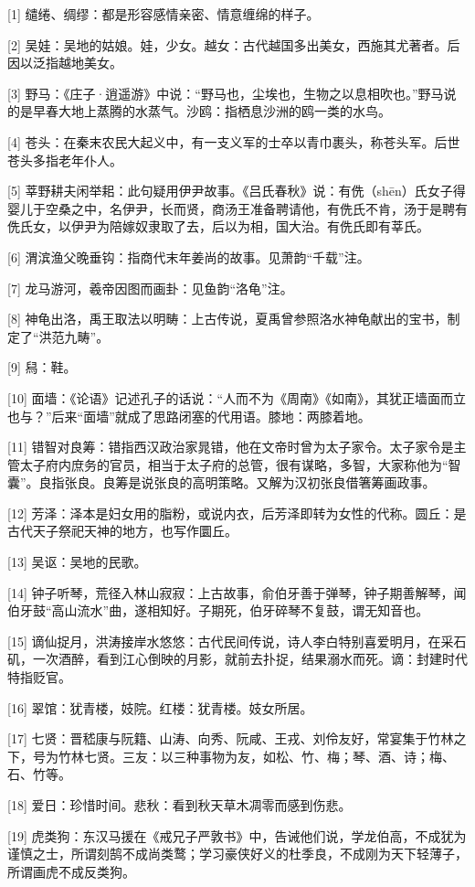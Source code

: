 \documentclass[12pt,UTF8]{ctexbook}
\begin{document}
[1] 缱绻、绸缪：都是形容感情亲密、情意缠绵的样子。

[2] 吴娃：吴地的姑娘。娃，少女。越女：古代越国多出美女，西施其尤著者。后因以泛指越地美女。

[3] 野马：《庄子·逍遥游》中说：“野马也，尘埃也，生物之以息相吹也。”野马说的是早春大地上蒸腾的水蒸气。沙鸥：指栖息沙洲的鸥一类的水鸟。

[4] 苍头：在秦末农民大起义中，有一支义军的士卒以青巾裹头，称苍头军。后世苍头多指老年仆人。

[5] 莘野耕夫闲举耜：此句疑用伊尹故事。《吕氏春秋》说：有侁（shēn）氏女子得婴儿于空桑之中，名伊尹，长而贤，商汤王准备聘请他，有侁氏不肯，汤于是聘有侁氏女，以伊尹为陪嫁奴隶取了去，后以为相，国大治。有侁氏即有莘氏。

[6] 渭滨渔父晚垂钩：指商代末年姜尚的故事。见萧韵“千载”注。

[7] 龙马游河，羲帝因图而画卦：见鱼韵“洛龟”注。

[8] 神龟出洛，禹王取法以明畴：上古传说，夏禹曾参照洛水神龟献出的宝书，制定了“洪范九畴”。

[9] 舄：鞋。

[10] 面墙：《论语》记述孔子的话说：“人而不为《周南》《如南》，其犹正墙面而立也与？”后来“面墙”就成了思路闭塞的代用语。膝地：两膝着地。

[11] 错智对良筹：错指西汉政治家晁错，他在文帝时曾为太子家令。太子家令是主管太子府内庶务的官员，相当于太子府的总管，很有谋略，多智，大家称他为“智囊”。良指张良。良筹是说张良的高明策略。又解为汉初张良借箸筹画政事。

[12] 芳泽：泽本是妇女用的脂粉，或说内衣，后芳泽即转为女性的代称。圆丘：是古代天子祭祀天神的地方，也写作圜丘。

[13] 吴讴：吴地的民歌。

[14] 钟子听琴，荒径入林山寂寂：上古故事，俞伯牙善于弹琴，钟子期善解琴，闻伯牙鼓“高山流水”曲，遂相知好。子期死，伯牙碎琴不复鼓，谓无知音也。

[15] 谪仙捉月，洪涛接岸水悠悠：古代民间传说，诗人李白特别喜爱明月，在采石矶，一次酒醉，看到江心倒映的月影，就前去扑捉，结果溺水而死。谪：封建时代特指贬官。

[16] 翠馆：犹青楼，妓院。红楼：犹青楼。妓女所居。

[17] 七贤：晋嵇康与阮籍、山涛、向秀、阮咸、王戎、刘伶友好，常宴集于竹林之下，号为竹林七贤。三友：以三种事物为友，如松、竹、梅；琴、酒、诗；梅、石、竹等。

[18] 爱日：珍惜时间。悲秋：看到秋天草木凋零而感到伤悲。

[19] 虎类狗：东汉马援在《戒兄子严敦书》中，告诫他们说，学龙伯高，不成犹为谨慎之士，所谓刻鹄不成尚类鹜；学习豪侠好义的杜季良，不成刚为天下轻薄子，所谓画虎不成反类狗。
\end{document}
